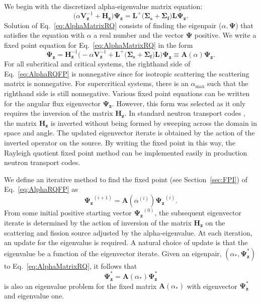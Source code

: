 We begin with the discretized alpha-eigenvalue matrix equation:
\begin{equation}
	\big ( \alpha \mathbf{V}_{\mathbf{z}}^{-1} + \mathbf{H_{z}} \big ) \mathbf{\Psi_{z}} = \mathbf{L}^{+} \big ( \mathbf{\Sigma_{s}} + \mathbf{\Sigma_{f}} \big ) \mathbf{L} \mathbf{\Psi_{z}}.
	\label{eq:AlphaMatrixRQ}
\end{equation}
Solution of Eq.~\ref{eq:AlphaMatrixRQ} consists of finding the eigenpair ($\alpha,\mathbf{\Psi}$) that satisfies the equation with $\alpha$ a real number and the vector $\mathbf{\Psi}$ positive. We write a fixed point equation for Eq.~\ref{eq:AlphaMatrixRQ} in the form
\begin{equation}
	\mathbf{\Psi_{z}} = \mathbf{H}^{-1}_{\mathbf{z}} \big ( -\alpha \mathbf{V}_{\mathbf{z}}^{-1} + \mathbf{L}^{+} \big ( \mathbf{\Sigma_{s}} + \mathbf{\Sigma_{f}} \big ) \mathbf{L} \big ) \mathbf{\Psi_{z}} \equiv \mathbf{A}(\alpha) \mathbf{\Psi_{z}}.
	\label{eq:AlphaRQFP}
\end{equation}
For all subcritical and critical systems, the righthand side of Eq.~\ref{eq:AlphaRQFP} is nonnegative since for isotropic scattering the scattering matrix is nonnegative. For supercritical systems, there is an $\alpha_{\text{max}}$ such that the righthand side is still nonnegative. Various fixed point equations can be written for the angular flux eigenvector $\mathbf{\Psi_{z}}$. However, this form was selected as it only requires the inversion of the matrix $\mathbf{H_{z}}$. In standard neutron transport codes \cite{hanebutte_ardra_1999} \cite{alcouffe2005partisn}, the matrix $\mathbf{H_{z}}$ is inverted without being formed by sweeping across the domain in space and angle. The updated eigenvector iterate is obtained by the action of the inverted operator on the source. By writing the fixed point in this way, the Rayleigh quotient fixed point method can be implemented easily in production neutron transport codes.

We define an iterative method to find the fixed point (see Section~\ref{sec:FPI}) of Eq.~\ref{eq:AlphaRQFP} as
\begin{equation}
	\mathbf{\Psi_{z}}^{(i+1)} = \mathbf{A}(\alpha^{(i)}) \mathbf{\Psi_{z}}^{(i)}.
\end{equation}
From some initial positive starting vector $\mathbf{\Psi_{z}}^{(0)}$, the subsequent eigenvector iterate is determined by the action of inversion of the matrix $\mathbf{H_{z}}$ on the scattering and fission source adjusted by the alpha-eigenvalue. At each iteration, an update for the eigenvalue is required. A natural choice of update is that the eigenvalue be a function of the eigenvector iterate. Given an eigenpair, $(\alpha_{*}, \mathbf{\Psi_{z}^{*}})$ to Eq.~\ref{eq:AlphaMatrixRQ}, it follows that
\begin{equation}
	\mathbf{\Psi_{z}^{*}} =  \mathbf{A}(\alpha_{*}) \mathbf{\Psi_{z}^{*}}
\end{equation}
is also an eigenvalue problem for the fixed matrix $\mathbf{A}(\alpha_{*})$ with eigenvector $\mathbf{\Psi}_{\mathbf{z}}^{*}$ and eigenvalue one.

